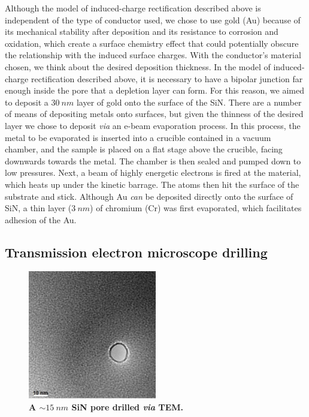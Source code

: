 			Although the model of induced-charge rectification described above is independent of the type of conductor used, we chose to use gold (Au) because of its mechanical stability after deposition and its resistance to corrosion and oxidation, which create a surface chemistry effect that could potentially obscure the relationship with the induced surface charges. With the conductor's material chosen, we think about the desired deposition thickness. In the model of induced-charge rectification described above, it is necessary to have a bipolar junction far enough inside the pore that a depletion layer can form. For this reason, we aimed to deposit a $\SI{30}{nm}$ layer of gold onto the surface of the SiN. There are a number of means of depositing metals onto surfaces, but given the thinness of the desired layer we chose to deposit \textit{via} an e-beam evaporation process. In this process, the metal to be evaporated is inserted into a crucible contained in a vacuum chamber, and the sample is placed on a flat stage above the crucible, facing downwards towards the metal. The chamber is then sealed and pumped down to low pressures. Next, a beam of highly energetic electrons is fired at the material, which heats up under the kinetic barrage. The atoms then hit the surface of the substrate and stick. Although Au \textit{can} be deposited directly onto the surface of SiN, a thin layer ($\SI{3}{nm}$) of chromium (Cr) was first evaporated, which facilitates adhesion of the Au.
			
		\subsection{Transmission electron microscope drilling}
		
			\begin{figure}
				\includegraphics[width=0.5\textwidth]{sinpore.png}
				\caption{\textbf{A $\sim\SI{15}{nm}$ SiN pore drilled \textit{via} TEM.}}
				\label{fig:sinpore}
			\end{figure}

